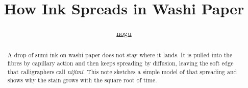 \documentclass[11pt]{article}
\title{How Ink Spreads in Washi Paper}
\author{\href{https://github.com/nogu66/calmpage}{nogu}}
\date{}
\begin{document}
\maketitle

\begin{abstract}
  A drop of sumi ink on washi paper does not stay where it
  lands. It is pulled into the fibres by capillary action
  and then keeps spreading by diffusion, leaving the soft
  edge that calligraphers call \emph{nijimi}. This note
  sketches a simple model of that spreading and shows why
  the stain grows with the square root of time.
\end{abstract}




\end{document}

